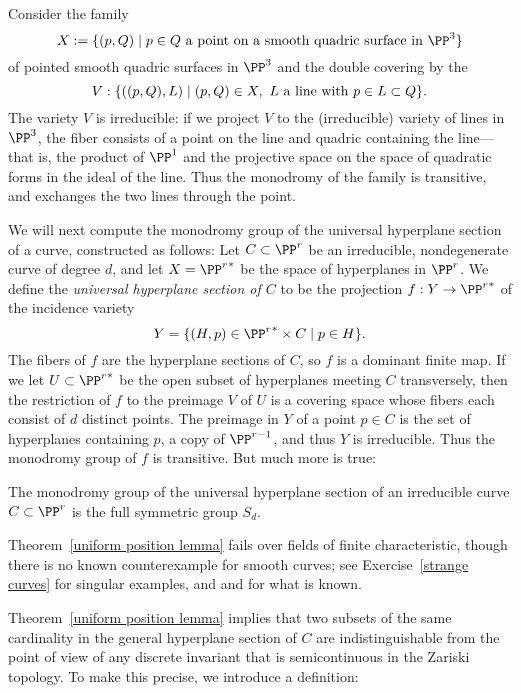 \begin{example}\label{monodromy of rulings}
Consider the family 
$$
X := \{(p,Q) \mid p\in Q\hbox{ a point on a smooth quadric surface in $\PP^3$}\}
$$
of pointed smooth quadric surfaces in $\PP^3$ and the double covering by the 
$$
V: \{((p,Q), L)\mid (p,Q)\in X,\ L \hbox{ a line with $p \in L\subset Q$}\}.
$$
The variety $V$ is irreducible: if we project $V$ to the (irreducible) variety of lines in $\PP^3$, 
the fiber consists of a point on the line and quadric containing the line---that is, the product
of $\PP^1$ and the projective space
on the space of quadratic forms in the ideal of the line. Thus the monodromy of the family
is transitive, and exchanges the two lines through the point.
\end{example}


We will next compute the monodromy group of the  universal hyperplane section of a curve, constructed as follows:
Let $C \subset \PP^r$ be an irreducible, nondegenerate curve of degree $d$, and let $X = {\PP^r}^*$ be the space of hyperplanes in $\PP^r$. We define the \emph{universal hyperplane section of $C$} to be the projection  $f: Y\to {\PP^r}^*$ of the incidence variety
$$
Y = \{ (H, p) \in {\PP^r}^* \times C \mid p \in H \}.
$$
The fibers of $f$ are the hyperplane
sections of $C$, so $f$ is a dominant finite map. If we let $U\subset {\PP^r}^*$ be the open subset of hyperplanes
meeting $C$ transversely, then the restriction of $f$ to the preimage $V$ of $U$ is a covering space
whose fibers each consist of $d$ distinct points. The preimage in $Y$ of a point $p\in C$ is the set of hyperplanes containing
$p$, a copy of $\PP^{r-1}$, and thus $Y$ is irreducible. Thus the monodromy group of $f$ is transitive. But much more is true:

\begin{theorem}\label{uniform position lemma}
The monodromy group of the universal hyperplane section of an irreducible curve $C \subset \PP^r$ is the full symmetric group $S_d$.
\end{theorem}

Theorem~\ref{uniform position lemma} fails over fields of finite characteristic, though there is no known counterexample for smooth curves; see Exercise~\ref{strange curves} for singular examples, and \cite{Rathmann} and \cite{Kadets} for what is known. 

Theorem~\ref{uniform position lemma} implies that two subsets of the same cardinality in the general hyperplane section of $C$
are indistinguishable from the point of view of any discrete invariant that is semicontinuous in the Zariski topology. To make this precise, we introduce a definition:

